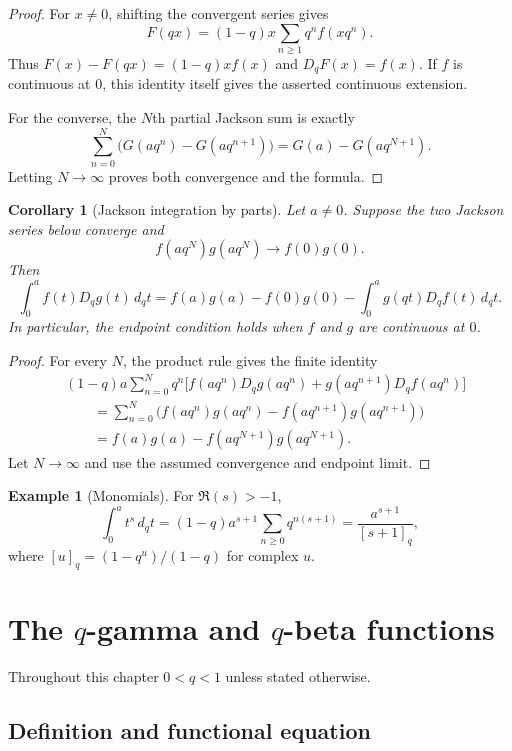 \documentclass[11pt,a4paper,oneside,openany]{book}
\newtheorem{corollary}[corollary]{Corollary}
\theoremstyle{definition}
\newtheorem{example}[example]{Example}
\theoremstyle{remark}
\begin{document}
\begin{proof}
For $x\ne0$, shifting the convergent series gives
\[
 F(qx)=(1-q)x\sum_{n\ge1}q^nf(xq^n).
\]
Thus $F(x)-F(qx)=(1-q)xf(x)$ and $D_qF(x)=f(x)$.  If $f$ is
continuous at $0$, this identity itself gives the asserted continuous
extension.

For the converse, the $N$th partial Jackson sum is exactly
\[
 \sum_{n=0}^{N}\bigl(G(aq^n)-G(aq^{n+1})\bigr)
 =G(a)-G(aq^{N+1}).
\]
Letting $N\to\infty$ proves both convergence and the formula.
\end{proof}

\begin{corollary}[Jackson integration by parts]\label{cor:q-integration-parts}
Let $a\ne0$.  Suppose the two Jackson series below converge and
\[
 f(aq^N)g(aq^N)\longrightarrow f(0)g(0).
\]
Then
\[
 \int_0^a f(t)D_qg(t)\,d_qt
 =f(a)g(a)-f(0)g(0)
 -\int_0^a g(qt)D_qf(t)\,d_qt.
\]
In particular, the endpoint condition holds when $f$ and $g$ are continuous
at $0$.
\end{corollary}

\begin{proof}
For every $N$, the product rule gives the finite identity
\begin{align*}
 &(1-q)a\sum_{n=0}^{N}q^n
 \bigl[f(aq^n)D_qg(aq^n)+g(aq^{n+1})D_qf(aq^n)\bigr]\\
 &\qquad=\sum_{n=0}^{N}
 \bigl(f(aq^n)g(aq^n)-f(aq^{n+1})g(aq^{n+1})\bigr)\\
 &\qquad=f(a)g(a)-f(aq^{N+1})g(aq^{N+1}).
\end{align*}
Let $N\to\infty$ and use the assumed convergence and endpoint limit.
\end{proof}

\begin{example}[Monomials]
For $\Re(s)>-1$,
\[
 \int_0^a t^s\,d_qt
 =(1-q)a^{s+1}\sum_{n\ge0}q^{n(s+1)}
 =\frac{a^{s+1}}{[s+1]_q},
\]
where $[u]_q=(1-q^u)/(1-q)$ for complex $u$.
\end{example}

\chapter{The \texorpdfstring{$q$}{q}-gamma and \texorpdfstring{$q$}{q}-beta functions}\label{chap:qgamma}

Throughout this chapter $0<q<1$ unless stated otherwise.

\section{Definition and functional equation}
\end{document}

